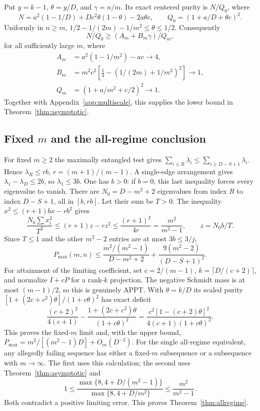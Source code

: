 Put $y=k-1$, $\theta=y/D$, and $\gamma=n/m$. Its exact centered
purity is $N/Q_0$, where
\[
 N=a^2(1-1/D)+Dc^2\theta(1-\theta)-2a\theta c,\qquad
 Q_0=(1+a/D+\theta c)^2.
\]
Uniformly in $n\geq m$,
$1/2-1/(2m)-1/m^2\leq\theta\leq1/2$. Consequently
\[
 N/Q_0\geq (A_m+B_m\gamma)/Q_m,
\]
for all sufficiently large $m$, where
\begin{align*}
 A_m&=a^2(1-1/m^2)-ac\to4,\\
 B_m&=m^2c^2\left[\tfrac14-(1/(2m)+1/m^2)^2\right]\to1,\\
 Q_m&=(1+a/m^2+c/2)^2\to1.
\end{align*}
Together with Appendix~\ref{app:multiscale}, this supplies the lower
bound in Theorem~\ref{thm:asymptotic}.

\subsection{\texorpdfstring{Fixed $m$ and the all-regime conclusion}{Fixed m and the all-regime conclusion}}
For fixed $m\geq2$ the maximally entangled test gives
$\sum_{i\leq R}\lambda_i\leq\sum_{i\geq D-S+1}\lambda_i$.
Hence $\lambda_R\leq rb$, $r=(m+1)/(m-1)$.
A single-edge arrangement gives $\lambda_1-\lambda_D\leq2b$,
so $\lambda_1\leq3b$. One has $b>0$: if $b=0$, this last
inequality forces every eigenvalue to vanish.
There are $N_0=D-m^2+2$ eigenvalues from index $R$ to index $D-S+1$,
all in $[b,rb]$. Let their sum be $T>0$. The inequality
$x^2\leq(r+1)bx-rb^2$ gives
\[
 \frac{N_0\sum x_i^2}{T^2}
 \leq(r+1)z-rz^2\leq\frac{(r+1)^2}{4r}
 =\frac{m^2}{m^2-1},\qquad z=N_0b/T.
\]
Since $T\leq1$ and the other $m^2-2$ entries are at most $3b\leq3/j$,
\[
 P_{\max}(m,n)\leq\frac{m^2/(m^2-1)}{D-m^2+2}
 +\frac{9(m^2-2)}{(D-S+1)^2}.
\]
For attainment of the limiting coefficient, set $c=2/(m-1)$,
$k=\lceil D/(c+2)\rceil$, and normalize $I+cP$ for a rank-$k$
projection. The negative Schmidt mass is at most $(m-1)/2$,
so this is genuinely APPT. With $\theta=k/D$ its scaled purity
$[1+(2c+c^2)\theta]/(1+c\theta)^2$ has exact deficit
\[
 \frac{(c+2)^2}{4(c+1)}
 -\frac{1+(2c+c^2)\theta}{(1+c\theta)^2}
 =\frac{c^2[1-(c+2)\theta]^2}{4(c+1)(1+c\theta)^2}.
\]
This proves the fixed-$m$ limit and, with the upper bound,
$P_{\max}=m^2/[(m^2-1)D]+O_m(D^{-2})$.
For the single all-regime equivalent, any allegedly failing sequence
has either a fixed-$m$ subsequence or a subsequence with $m\to\infty$.
The first uses this calculation; the second uses
Theorem~\ref{thm:asymptotic} and
\[
 1\leq
 \frac{\max\{8,4+D/(m^2-1)\}}{\max\{8,4+D/m^2\}}
 \leq\frac{m^2}{m^2-1}.
\]
Both contradict a positive limiting error. This proves
Theorem~\ref{thm:allregime}.

